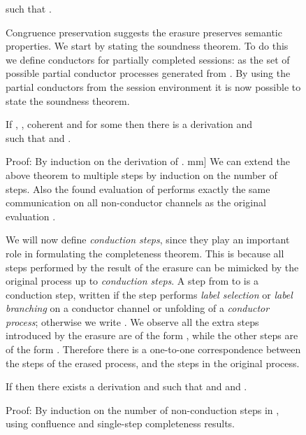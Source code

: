 \begin{figure}[t]
\begin{THM}
such that .
\end{THM} \newcommand{\cin}[1]{\texttt{in}_{#1}}
\newcommand{\cout}[1]{\texttt{out}_{#1}}
\newcommand{\cina}{\texttt{i}_{\pp[1]}}
\newcommand{\couta}{\texttt{o}_{\pp[1]}}
\newcommand{\cinb}{\texttt{i}_{\pp[2]}}
\newcommand{\coutb}{\texttt{o}_{\pp[2]}}
\newcommand{\PC}{\texttt{PC}}
Congruence preservation suggests the erasure preserves semantic properties.
We start by stating the soundness theorem. To do this we define conductors for
partially completed sessions:  as the set of possible partial conductor
processes generated from .
By using the partial conductors from the session environment it is now possible
to state the soundness theorem.
\begin{THM}[Soundness] \label{thm:erasure:semantics}
If , ,
 coherent and 
 for some  then there is
a derivation  and 
 \\
such that  and .
\end{THM} {\sc Proof:} By induction on the derivation of .
\1mm] We can extend the above theorem to multiple
steps by induction on the number of steps.
Also the found evaluation of  performs
exactly the same communication on all non-conductor channels as the original
evaluation .
\newcommand{\tores}{\nobreak{\ensuremath{\rightharpoondown}} }
\newcommand{\toplus}{\nobreak{\ensuremath{\rightharpoonup}} }

We will now define \emph{conduction steps}, since they play an important role
in formulating the completeness theorem.  This is because all steps performed
by the result of the erasure can be mimicked by the original process up to
\emph{conduction steps}.
A step from  to  is a conduction step, written  if the step performs
\emph{label selection} or \emph{label branching} on a conductor channel or
unfolding of a \emph{conductor process}; otherwise we write .
We observe all the extra steps introduced by the erasure are of the form
, while the other steps are of the form . Therefore there is a
one-to-one correspondence between the  steps of the erased process,
and the steps in the original process.

\begin{THM} \label{thm:erasure:completeness}
If  
then there exists a derivation 
 and  such that  and  and .
\end{THM} {\sc Proof:} By induction on the number of non-conduction steps in ,
using confluence and single-step completeness results.



\end{figure}
